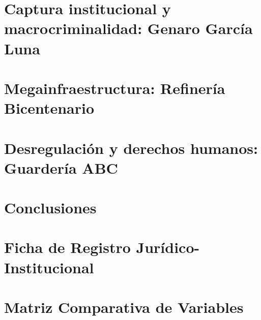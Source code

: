 \documentclass[12pt,letterpaper,oneside,openany]{book}
\begin{document}
\clearpage

\chapter{Captura institucional y macrocriminalidad: Genaro García Luna}



\clearpage

\chapter{Megainfraestructura: Refinería Bicentenario}



\clearpage

\chapter{Desregulación y derechos humanos: Guardería ABC}



\clearpage

\chapter{Conclusiones}



\clearpage


\nocite{*}



\appendix

\chapter{Ficha de Registro Jurídico-Institucional}


\chapter{Matriz Comparativa de Variables}

\end{document}
